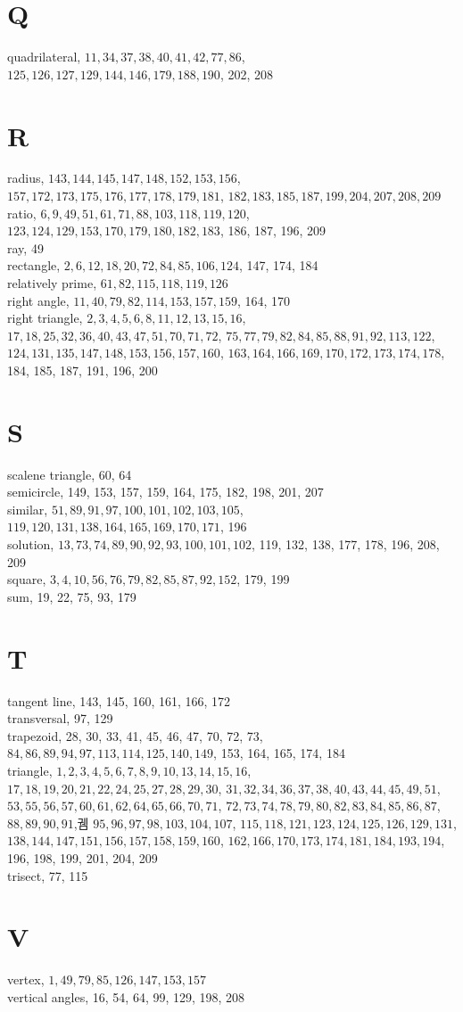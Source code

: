 \documentclass[10pt]{article}
\begin{document}
\section*{Q}
quadrilateral, \(11,34,37,38,40,41,42,77,86\), \(125,126,127,129,144,146,179,188,190\), 202, 208

\section*{R}
radius, \(143,144,145,147,148,152,153,156\), \(157,172,173,175,176,177,178,179,181\), \(182,183,185,187,199,204,207,208,209\)\\
ratio, \(6,9,49,51,61,71,88,103,118,119,120\), \(123,124,129,153,170,179,180,182,183\), 186, 187, 196, 209\\
ray, 49\\
rectangle, \(2,6,12,18,20,72,84,85,106,124\), 147, 174, 184\\
relatively prime, \(61,82,115,118,119,126\)\\
right angle, \(11,40,79,82,114,153,157,159\), 164, 170\\
right triangle, \(2,3,4,5,6,8,11,12,13,15,16\), \(17,18,25,32,36,40,43,47,51,70,71,72\), \(75,77,79,82,84,85,88,91,92,113,122\), \(124,131,135,147,148,153,156,157,160\), \(163,164,166,169,170,172,173,174,178\), 184, 185, 187, 191, 196, 200

\section*{S}
scalene triangle, 60, 64\\
semicircle, 149, 153, 157, 159, 164, 175, 182, 198, 201, 207\\
similar, \(51,89,91,97,100,101,102,103,105\), \(119,120,131,138,164,165,169,170,171\), 196\\
solution, \(13,73,74,89,90,92,93,100,101,102\), 119, 132, 138, 177, 178, 196, 208, 209\\
square, \(3,4,10,56,76,79,82,85,87,92,152\), 179, 199\\
sum, 19, 22, 75, 93, 179

\section*{T}
tangent line, 143, 145, 160, 161, 166, 172\\
transversal, 97, 129\\
trapezoid, 28, 30, 33, 41, 45, 46, 47, 70, 72, 73, \(84,86,89,94,97,113,114,125,140,149\), 153, 164, 165, 174, 184\\
triangle, \(1,2,3,4,5,6,7,8,9,10,13,14,15,16\), \(17,18,19,20,21,22,24,25,27,28,29,30\), \(31,32,34,36,37,38,40,43,44,45,49,51\), \(53,55,56,57,60,61,62,64,65,66,70,71\), \(72,73,74,78,79,80,82,83,84,85,86,87\), \(88,89,90,91\),궴 \(95,96,97,98,103,104,107\), \(115,118,121,123,124,125,126,129,131\), \(138,144,147,151,156,157,158,159,160\), \(162,166,170,173,174,181,184,193,194\), 196, 198, 199, 201, 204, 209\\
trisect, 77, 115

\section*{V}
vertex, \(1,49,79,85,126,147,153,157\)\\
vertical angles, 16, 54, 64, 99, 129, 198, 208
\end{document}
